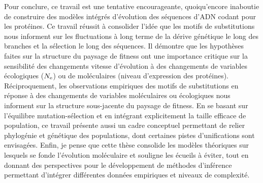 Pour conclure, ce travail est une tentative encourageante, quoiqu'encore inaboutie de construire des modèles intégrés d'évolution des séquences d'ADN codant pour les protéines.
Ce travail réussit à consolider l'idée que les motifs de substitutions nous informent sur les fluctuations à long terme de la dérive génétique le long des branches et la sélection le long des séquences.
Il démontre que les hypothèses faites sur la structure du paysage de fitness ont une importance critique sur la sensibilité des changements vitesse d'évolution à des changements de variables écologiques ($N_{\text{e}}$) ou de moléculaires (niveau d'expression des protéines).
Réciproquement, les observations empiriques des motifs de substitutions en réponse à des changements de variables moléculaires ou écologiques nous informent sur la structure sous-jacente du paysage de fitness.
En se basant sur l'équilibre mutation-sélection et en intégrant explicitement la taille efficace de population, ce travail présente aussi un cadre conceptuel permettant de relier phylogénie et génétique des populations, dont certaines pistes d'unifications sont envisagées.
Enfin, je pense que cette thèse consolide les modèles théoriques sur lesquels se fonde l'évolution moléculaire et souligne les écueils à éviter, tout en donnant des perspectives pour le développement de méthodes d'inférence permettant d'intégrer différentes données empiriques et niveaux de complexité.